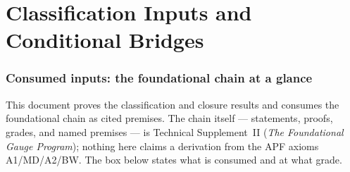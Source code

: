 \documentclass[11pt]{article}
\theoremstyle{definition}
\newcommand{\TSII}{Technical Supplement~II (\emph{The Foundational Gauge Program})}
\begin{document}
\newpage

\part{Classification Inputs and Conditional Bridges}
\label{part:core}


\section{Consumed inputs: the foundational chain at a glance}
\label{sec:consumed_inputs}

This document proves the classification and closure results and
consumes the foundational chain as cited premises.  The chain itself
--- statements, proofs, grades, and named premises --- is \TSII;
nothing here claims a derivation from the APF axioms A1/MD/A2/BW.  The
box below states what is consumed and at what grade.
\end{document}
